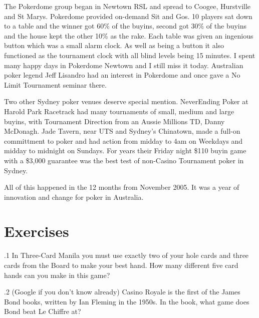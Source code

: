 
The Pokerdome group began in Newtown RSL and spread to Coogee,
Hurstville and St Marys. Pokerdome provided on-demand Sit and Gos.
10 players sat down to a table and the winner got 60\% of the buyins,
second got 30\% of the buyins and the house kept the other 10\% as the
rake. Each table was given an ingenious button which was a small
alarm clock. As well as being a button it also functioned
as the tournament clock with all blind levels being 15 minutes.
I spent many happy days in Pokerdome Newtown and I still miss it
today. Australian poker legend Jeff Lisandro had an interest in
Pokerdome and once gave a No Limit Tournament seminar there.

Two other Sydney poker venues deserve special mention. NeverEnding
Poker at Harold Park Racetrack had many tournaments of small, medium
and large buyins, with Tournament Direction from an Aussie Millions
TD, Danny McDonagh. Jade Tavern, near UTS and Sydney's Chinatown, made
a full-on committment to poker and had action from midday to 4am on
Weekdays and midday to midnight on Sundays. For years their Friday
night \$110 buyin game with a \$3,000 guarantee was the best test of
non-Casino Tournament poker in Sydney.

All of this happened in the 12 months from November 2005. It was a
year of innovation and change for poker in Australia.


\section{Exercises}

.1 In Three-Card Manila you must use exactly two of
your hole cards and three cards from the Board to make your best
hand. How many different five card hands can you make in this game?

.2 (Google if you don't know already) Casino Royale
is the first of the James Bond books, written by Ian Fleming in the
1950s. In the book, what game does Bond beat Le Chiffre at?
